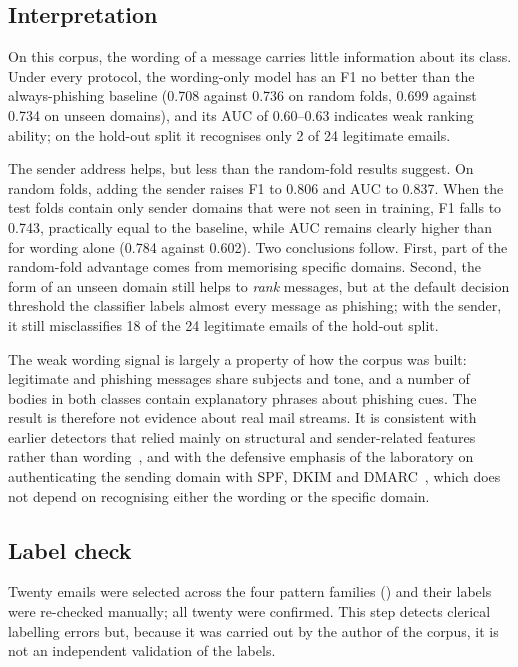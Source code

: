 \subsection{Interpretation}

On this corpus, the wording of a message carries little information about its class. Under every protocol, the wording-only model has an F1 no better than the always-phishing baseline (0.708 against 0.736 on random folds, 0.699 against 0.734 on unseen domains), and its AUC of 0.60--0.63 indicates weak ranking ability; on the hold-out split it recognises only 2 of 24 legitimate emails.

The sender address helps, but less than the random-fold results suggest. On random folds, adding the sender raises F1 to 0.806 and AUC to 0.837. When the test folds contain only sender domains that were not seen in training, F1 falls to 0.743, practically equal to the baseline, while AUC remains clearly higher than for wording alone (0.784 against 0.602). Two conclusions follow. First, part of the random-fold advantage comes from memorising specific domains. Second, the form of an unseen domain still helps to \emph{rank} messages, but at the default decision threshold the classifier labels almost every message as phishing; with the sender, it still misclassifies 18 of the 24 legitimate emails of the hold-out split.

The weak wording signal is largely a property of how the corpus was built: legitimate and phishing messages share subjects and tone, and a number of bodies in both classes contain explanatory phrases about phishing cues. The result is therefore not evidence about real mail streams. It is consistent with earlier detectors that relied mainly on structural and sender-related features rather than wording~\cite{fette2007learning}, and with the defensive emphasis of the laboratory on authenticating the sending domain with SPF, DKIM and DMARC~\cite{rfc7208,rfc6376,rfc9989}, which does not depend on recognising either the wording or the specific domain.

\subsection{Label check}

Twenty emails were selected across the four pattern families () and their labels were re-checked manually; all twenty were confirmed. This step detects clerical labelling errors but, because it was carried out by the author of the corpus, it is not an independent validation of the labels.

